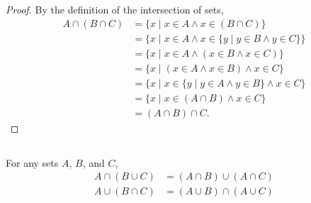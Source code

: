 \documentclass{report}
\begin{document}
\begin{proof}
    By the definition of the intersection of sets,
      \begin{align*}
        A \cap (B \cap C)
          & = \{ x \mid x \in A \land x \in (B \cap C) \} \\
          & = \{ x \mid x \in A \land
                        x \in \{ y \mid y \in B \land y \in C \}\} \\
          & = \{ x \mid x \in A \land (x \in B \land x \in C) \} \\
          & = \{ x \mid (x \in A \land x \in B) \land x \in C \} \\
          & = \{ x \mid x \in \{ y \mid y \in A \land y \in B \} \land
                        x \in C \} \\
          & = \{ x \mid x \in (A \cap B) \land x \in C \} \\
          & = (A \cap B) \cap C.
      \end{align*}

\end{proof}

\subsection{}%

For any sets $A$, $B$, and $C$,
  \begin{align*}
    A \cap (B \cup C) & = (A \cap B) \cup (A \cap C) \\
    A \cup (B \cap C) & = (A \cup B) \cap (A \cup C)
  \end{align*}
\end{document}
